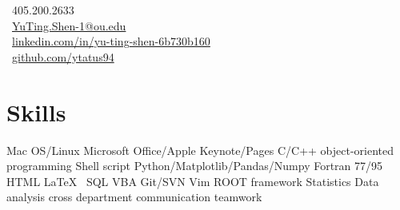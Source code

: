 \documentclass[letterpaper]{deedy-resume-openfont}
\begin{document}
%
%
\lastupdated

%
%

{
    \faPhone \ 405.200.2633\\
    \faEnvelope \ \href{mailto:YuTing.Shen-1@ou.edu}{YuTing.Shen-1@ou.edu}\\
    \faLinkedinSquare \ \href{https://www.linkedin.com/in/yu-ting-shen-6b730b160/}{linkedin.com/in/yu-ting-shen-6b730b160}\\
    \faGithub \ \href{https://github.com/ytatus94}{github.com/ytatus94}
}




\section{Skills}
\raggedright{
	Mac OS/Linux \textbullet{} Microsoft Office/Apple Keynote/Pages \textbullet{} C/C++ \textbullet{} object-oriented programming \textbullet{} Shell script \textbullet{} Python/Matplotlib/Pandas/Numpy \textbullet{} Fortran 77/95 \textbullet{} HTML \textbullet{} \LaTeX\ \textbullet{} SQL \textbullet{} VBA \textbullet{} Git/SVN \textbullet{} Vim \textbullet{} ROOT framework \textbullet{} Statistics \textbullet{} Data analysis \textbullet{} cross department communication \textbullet{} teamwork\\
}
\sectionsep
\end{document}
